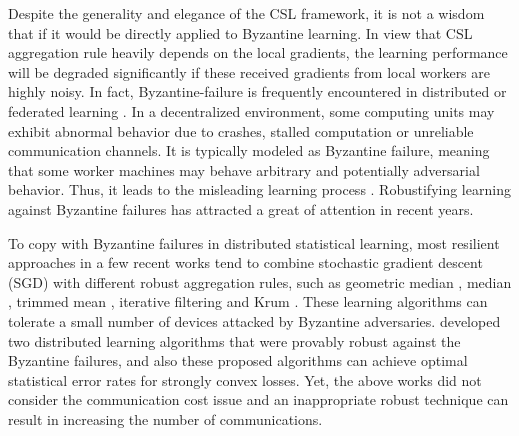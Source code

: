 \documentclass[12pt,a4paper]{article}%
\numberwithin{equation}{section}
\begin{document}
Despite the generality and elegance of the CSL framework, it is not a wisdom that if it would be directly applied  to   Byzantine learning. In view that CSL aggregation rule heavily depends on the local gradients, the learning performance will be degraded significantly  if these received gradients from local workers are highly noisy.
In fact, Byzantine-failure is frequently encountered in distributed or federated learning \citep{YinChenRB2018}. In a decentralized environment, some computing units may exhibit abnormal behavior due to crashes, stalled computation or unreliable communication channels. It is typically modeled as Byzantine failure, meaning that some worker machines may behave arbitrary and potentially adversarial behavior. Thus, it leads to the misleading learning process \citep{VempatyTongV2013,YangGangB2019,WuLingChenG2019}. Robustifying learning against Byzantine failures has attracted a great of attention in recent years.









To copy with Byzantine failures in distributed statistical learning, most resilient approaches in a few recent works tend to combine stochastic gradient descent (SGD) with different robust aggregation rules, such as geometric median \citep{Minsker2015, ChenSuXu2017}, median \citep{XieKoyejoG2018, YinChenRB2018}, trimmed mean \citep{YinChenRB2018}, iterative filtering \citep{SuXu2018} and Krum \citep{BlanchardMhamdiGS2017}. These learning algorithms can tolerate a small number of devices attacked by Byzantine adversaries. \cite{YinChenRB2018} developed two distributed learning algorithms that were provably robust against the Byzantine failures, and also these proposed algorithms can achieve optimal statistical error rates for strongly convex losses. Yet, the above works did not consider the communication cost issue and an inappropriate robust technique can result in increasing the number of communications.


\end{document}
